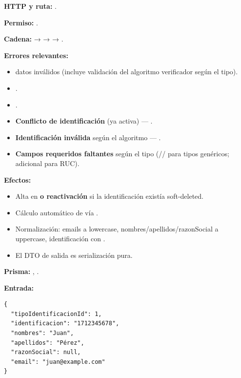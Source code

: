 \textbf{HTTP y ruta:} \texttt{}.


\textbf{Permiso:} \texttt{}.


\textbf{Cadena:} \texttt{} → \texttt{} → \texttt{} → \texttt{}.


\textbf{Errores relevantes:}
\begin{itemize}
\item \texttt{} datos inválidos (incluye validación del algoritmo verificador según el tipo).
\item \texttt{}.
\item \texttt{}.
\item \textbf{Conflicto de identificación} (ya activa) --- \texttt{}.
\item \textbf{Identificación inválida} según el algoritmo --- \texttt{}.
\item \textbf{Campos requeridos faltantes} según el tipo (\texttt{}/\texttt{}/\texttt{} para tipos genéricos; \texttt{} adicional para RUC).
\end{itemize}

\textbf{Efectos:}
\begin{itemize}
\item Alta en \texttt{} \textbf{o reactivación} si la identificación existía soft-deleted.
\item Cálculo automático de \texttt{} vía \texttt{}.
\item Normalización: emails a lowercase, nombres/apellidos/razonSocial a uppercase, identificación con \texttt{}.
\item El DTO de salida es serialización pura.
\end{itemize}


\textbf{Prisma:} \texttt{}, \texttt{}.


\textbf{Entrada:}


\begin{lstlisting}
{
  "tipoIdentificacionId": 1,
  "identificacion": "1712345678",
  "nombres": "Juan",
  "apellidos": "Pérez",
  "razonSocial": null,
  "email": "juan@example.com"
}
\end{lstlisting}


